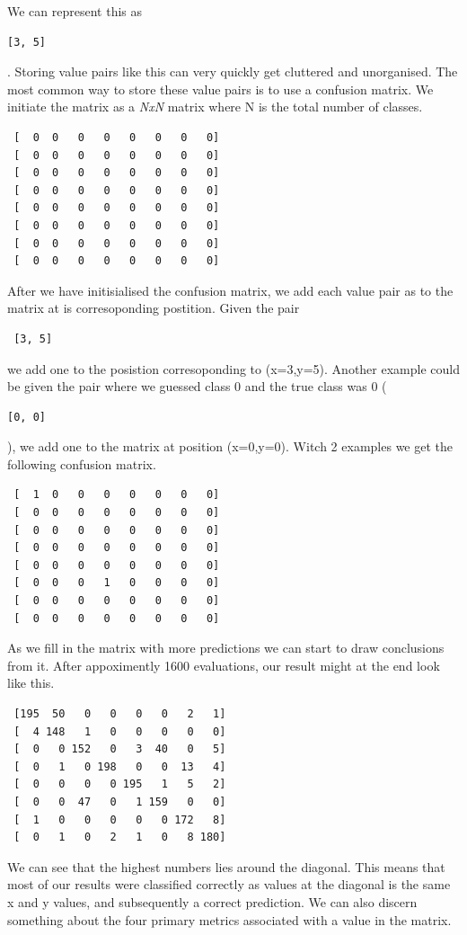 We can represent this as 
\begin{verbatim}
[3, 5] 
\end{verbatim}.
Storing value pairs like this can very quickly get cluttered and unorganised.
The most common way to store these value pairs is to use a confusion matrix.  We initiate the matrix as a \textit{NxN} matrix where N is the total number of classes.
\begin{verbatim}
 [  0  0   0   0   0   0   0   0]
 [  0  0   0   0   0   0   0   0]
 [  0  0   0   0   0   0   0   0]
 [  0  0   0   0   0   0   0   0]
 [  0  0   0   0   0   0   0   0]
 [  0  0   0   0   0   0   0   0]
 [  0  0   0   0   0   0   0   0]
 [  0  0   0   0   0   0   0   0]
\end{verbatim} 
After we have initisialised the confusion matrix, we add each value pair as to the matrix at is corresoponding postition.  Given the pair \begin{verbatim} [3, 5]  \end{verbatim} we add one to the posistion corresoponding to (x=3,y=5).  Another example could be given the pair where we guessed class 0 and the true class was 0 (\begin{verbatim}[0, 0] \end{verbatim}), we add one to the matrix at position (x=0,y=0). Witch 2 examples we get the following confusion matrix.
\begin{verbatim}
 [  1  0   0   0   0   0   0   0]
 [  0  0   0   0   0   0   0   0]
 [  0  0   0   0   0   0   0   0]
 [  0  0   0   0   0   0   0   0]
 [  0  0   0   0   0   0   0   0]
 [  0  0   0   1   0   0   0   0]
 [  0  0   0   0   0   0   0   0]
 [  0  0   0   0   0   0   0   0]
\end{verbatim}
As we fill in the matrix with more predictions we can start to draw conclusions from it. After appoximently 1600 evaluations, our result might at the end look like this.
\begin{verbatim}
 [195  50   0   0   0   0   2   1]
 [  4 148   1   0   0   0   0   0]
 [  0   0 152   0   3  40   0   5]
 [  0   1   0 198   0   0  13   4]
 [  0   0   0   0 195   1   5   2]
 [  0   0  47   0   1 159   0   0]
 [  1   0   0   0   0   0 172   8]
 [  0   1   0   2   1   0   8 180]
\end{verbatim}
We can see that the highest numbers lies around the diagonal. This means that most of our results were classified correctly as values at the diagonal is the same x and y values, and subsequently a correct prediction. 
We can also discern something about the four primary metrics associated with a value in the matrix.\\

